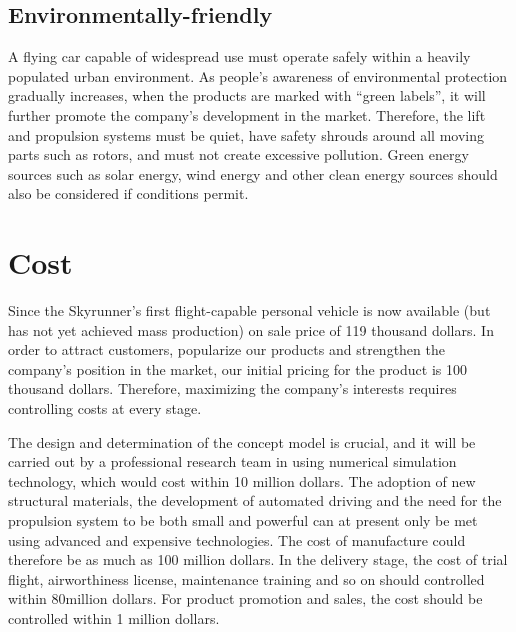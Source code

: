 \subsection{Environmentally-friendly}

A flying car capable of widespread use must operate safely within a heavily populated urban environment. As people's awareness of environmental protection gradually increases, when the products are marked with “green labels”, it will further promote the company's development in the market. Therefore, the lift and propulsion systems must be quiet, have safety shrouds around all moving parts such as rotors, and must not create excessive pollution. Green energy sources such as solar energy, wind energy and other clean energy sources should also be considered if conditions permit.

\section{Cost}

Since the Skyrunner’s first flight-capable personal vehicle is now available (but has not yet achieved mass production) on sale price of 119 thousand dollars. In order to attract customers, popularize our products and strengthen the company's position in the market, our initial pricing for the product is 100 thousand dollars. Therefore, maximizing the company's interests requires controlling costs at every stage.

The design and determination of the concept model is crucial, and it will be carried out by a professional research team in using numerical simulation technology, which would cost within 10 million dollars. The adoption of new structural materials, the development of automated driving and the need for the propulsion system to be both small and powerful can at present only be met using advanced and expensive technologies. The cost of manufacture could therefore be as much as 100 million dollars. In the delivery stage, the cost of trial flight, airworthiness license, maintenance training and so on should controlled within 80million dollars. For product promotion and sales, the cost should be controlled within 1 million dollars.





